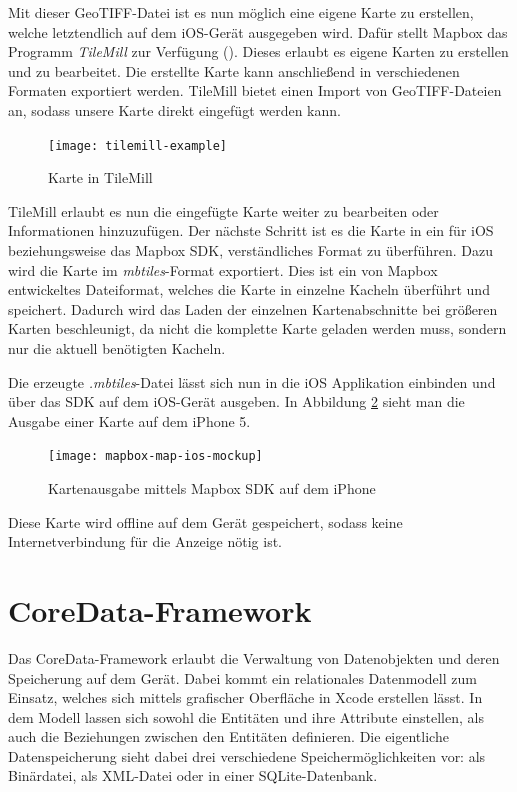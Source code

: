 Mit dieser GeoTIFF-Datei ist es nun möglich eine eigene Karte zu erstellen, welche letztendlich auf dem iOS-Gerät ausgegeben wird.
Dafür stellt Mapbox das Programm \emph{TileMill} zur Verfügung (\citet{tilemill}). Dieses erlaubt es eigene Karten zu erstellen und zu bearbeitet. Die erstellte Karte kann anschließend in verschiedenen Formaten exportiert werden. 
TileMill bietet einen Import von GeoTIFF-Dateien an, sodass unsere Karte direkt eingefügt werden kann.

\begin{figure}[htb!]
	\centering
	\texttt{[image: tilemill-example]}
	\caption{Karte in TileMill}
	\label{tilemill-example}
\end{figure}

TileMill erlaubt es nun die eingefügte Karte weiter zu bearbeiten oder Informationen hinzuzufügen.
Der nächste Schritt ist es die Karte in ein für iOS beziehungsweise das Mapbox SDK, verständliches Format zu überführen.
Dazu wird die Karte im \emph{mbtiles}-Format exportiert. Dies ist ein von Mapbox entwickeltes Dateiformat, welches die Karte in einzelne Kacheln überführt und speichert. Dadurch wird das Laden der einzelnen Kartenabschnitte bei größeren Karten beschleunigt, da nicht die komplette Karte geladen werden muss, sondern nur die aktuell benötigten Kacheln.

Die erzeugte \emph{.mbtiles}-Datei lässt sich nun in die iOS Applikation einbinden und über das SDK auf dem iOS-Gerät ausgeben. In Abbildung \ref{mapbox-map-ios} sieht man die Ausgabe einer Karte auf dem iPhone 5.

\begin{figure}[htb!]
		\centering
	\texttt{[image: mapbox-map-ios-mockup]}
	\caption{Kartenausgabe mittels Mapbox SDK auf dem iPhone}
	\label{mapbox-map-ios}
\end{figure}

Diese Karte wird offline auf dem Gerät gespeichert, sodass keine Internetverbindung für die Anzeige nötig ist.

\section{CoreData-Framework}
\label{sec:technologies:coredata}
Das CoreData-Framework erlaubt die Verwaltung von Datenobjekten und deren Speicherung auf dem Gerät.
Dabei kommt ein relationales Datenmodell zum Einsatz, welches sich mittels grafischer Oberfläche in Xcode erstellen lässt.
In dem Modell lassen sich sowohl die Entitäten und ihre Attribute einstellen, als auch die Beziehungen zwischen den Entitäten definieren.
Die eigentliche Datenspeicherung sieht dabei drei verschiedene Speichermöglichkeiten vor: als Binärdatei, als XML-Datei oder in einer SQLite-Datenbank. 

